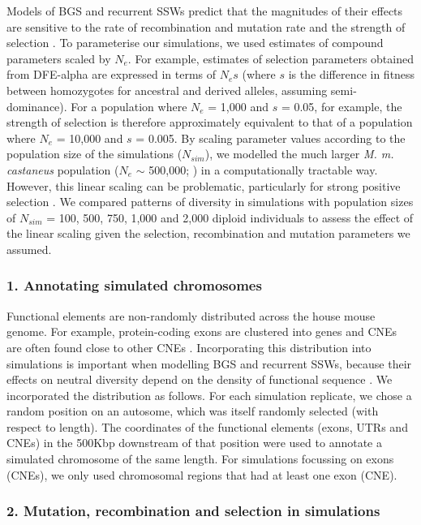 Models of BGS and recurrent SSWs predict that the magnitudes of their effects are sensitive to the rate of recombination and mutation rate and the strength of selection \citep{RN277, RN157, RN226}. To parameterise our simulations, we used estimates of compound parameters scaled by $N_e$. For example, estimates of selection parameters obtained from DFE-alpha are expressed in terms of $N_es$ (where $s$ is the difference in fitness between homozygotes for ancestral and derived alleles, assuming semi-dominance). For a population where $N_e$ = 1,000 and $s$ = 0.05, for example, the strength of selection is therefore approximately equivalent to that of a population where $N_e$ = 10,000 and $s$ = 0.005. By scaling parameter values according to the population size of the simulations ($N_{sim}$), we modelled the much larger \textit{M. m. castaneus} population ($N_e$ $\sim$ 500,000; \citealt{RN315}) in a computationally tractable way. However, this linear scaling can be problematic, particularly for strong positive selection \citep{RN198}. We compared patterns of diversity in simulations with population sizes of $N_{sim}$ = 100, 500, 750, 1,000 and 2,000 diploid individuals to assess the effect of the linear scaling given the selection, recombination and mutation parameters we assumed.

\subsubsection{1. Annotating simulated chromosomes}

	Functional elements are non-randomly distributed across the house mouse genome. For example, protein-coding exons are clustered into genes and CNEs are often found close to other CNEs \citep{RN122}. Incorporating this distribution into simulations is important when modelling BGS and recurrent SSWs, because their effects on neutral diversity depend on the density of functional sequence \citep{RN157,RN290}. We incorporated the distribution as follows. For each simulation replicate, we chose a random position on an autosome, which was itself randomly selected (with respect to length). The coordinates of the functional elements (exons, UTRs and CNEs) in the 500Kbp downstream of that position were used to annotate a simulated chromosome of the same length. For simulations focussing on exons (CNEs), we only used chromosomal regions that had at least one exon (CNE).

\subsubsection{2. Mutation, recombination and selection in simulations}
 
